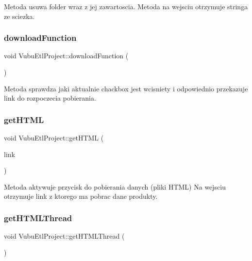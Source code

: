 Metoda usuwa folder wraz z jej zawartoscia. Metoda na wejsciu otrzymuje stringa ze sciezka. \mbox{\label{class_vubu_etl_project_ae737e131ae6ce3de41151ac665e6e0d5}} 
\subsubsection{\texorpdfstring{download\+Function}{downloadFunction}}
{\footnotesize\ttfamily void Vubu\+Etl\+Project\+::download\+Function (\begin{DoxyParamCaption}{ }\end{DoxyParamCaption})\hspace{0.3cm}{\ttfamily [slot]}}



Metoda sprawdza jaki aktualnie chackbox jest wcisniety i odpowiednio przekazuje link do rozpoczecia pobierania. 

\mbox{\label{class_vubu_etl_project_a0ec762e8da4850d4df4a9cc4ca853bc0}} 
\subsubsection{\texorpdfstring{get\+H\+T\+ML}{getHTML}}
{\footnotesize\ttfamily void Vubu\+Etl\+Project\+::get\+H\+T\+ML (\begin{DoxyParamCaption}\item[{Q\+String}]{link }\end{DoxyParamCaption})\hspace{0.3cm}{\ttfamily [slot]}}

Metoda aktywuje przycisk do pobierania danych (pliki H\+T\+ML) Na wejsciu otrzymuje link z ktorego ma pobrac dane produkty. \mbox{\label{class_vubu_etl_project_af15be1aa31f4d30e0b8c14495848fe49}} 
\subsubsection{\texorpdfstring{get\+H\+T\+M\+L\+Thread}{getHTMLThread}}
{\footnotesize\ttfamily void Vubu\+Etl\+Project\+::get\+H\+T\+M\+L\+Thread (\begin{DoxyParamCaption}{ }\end{DoxyParamCaption})\hspace{0.3cm}{\ttfamily [slot]}}



